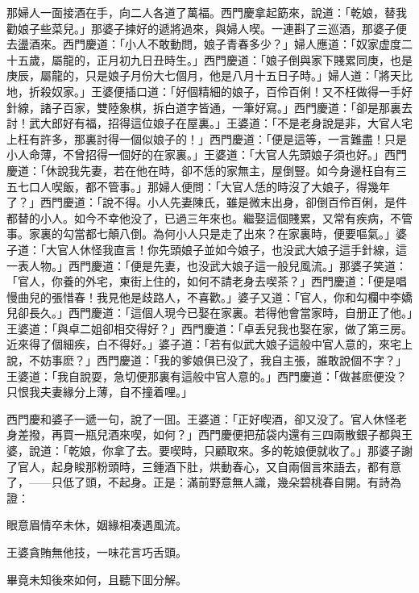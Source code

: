 那婦人一面接酒在手，向二人各道了萬福。西門慶拿起筯來，說道：「乾娘，替我勸娘子些菜兒。」那婆子揀好的遞將過來，與婦人喫。一連斟了三巡酒，那婆子便去盪酒來。西門慶道：「小人不敢動問，娘子青春多少？」婦人應道：「奴家虚度二十五歲，屬龍的，正月初九日丑時生。」西門慶道：「娘子倒與家下賤累同庚，也是庚辰，屬龍的，只是娘子月份大七個月，他是八月十五日子時。」婦人道：「將天比地，折殺奴家。」王婆便插口道：「好個精細的娘子，百伶百俐！又不枉做得一手好針線，諸子百家，雙陸象棋，拆白道字皆通，一筆好寫。」西門慶道：「卻是那裏去討！武大郎好有福，招得這位娘子在屋裏。」王婆道：「不是老身說是非，大官人宅上枉有許多，那裏討得一個似娘子的！」西門慶道：「便是這等，一言難盡！只是小人命薄，不曾招得一個好的在家裏。」王婆道：「大官人先頭娘子須也好。」西門慶道：「休說我先妻，若在他在時，卻不恁的家無主，屋倒豎。如今身邊枉自有三五七口人喫飯，都不管事。」那婦人便問：「大官人恁的時沒了大娘子，得幾年了？」西門慶道：「說不得。小人先妻陳氏，雖是微末出身，卻倒百伶百俐，是件都替的小人。如今不幸他没了，已過三年來也。繼娶這個賤累，又常有疾病，不管事。家裏的勾當都七顛八倒。為何小人只是走了出來？在家裏時，便要嘔氣。」婆子道：「大官人休怪我直言！你先頭娘子並如今娘子，也没武大娘子這手針線，這一表人物。」西門慶道：「便是先妻，也没武大娘子這一般兒風流。」那婆子笑道：「官人，你養的外宅，東街上住的，如何不請老身去喫茶？」西門慶道：「便是唱慢曲兒的張惜春！我見他是歧路人，不喜歡。」婆子又道：「官人，你和勾欄中李嬌兒卻長久。」西門慶道：「這個人現今已娶在家裏。若得他會當家時，自册正了他。」王婆道：「與卓二姐卻相交得好？」西門慶道：「卓丢兒我也娶在家，做了第三房。近來得了個細疾，白不得好。」婆子道：「若有似武大娘子這般中官人意的，來宅上說，不妨事麽？」西門慶道：「我的爹娘俱已没了，我自主張，誰敢說個不字？」王婆道：「我自說耍，急切便那裏有這般中官人意的。」西門慶道：「做甚麽便没？只恨我夫妻緣分上薄，自不撞着哩。」

西門慶和婆子一遞一句，說了一囬。王婆道：「正好喫酒，卻又没了。官人休怪老身差撥，再買一瓶兒酒來喫，如何？」西門慶便把茄袋内還有三四兩散銀子都與王婆，說道：「乾娘，你拿了去。要喫時，只顧取來。多的乾娘便就收了。」那婆子謝了官人，起身睃那粉頭時，三鍾酒下肚，烘動春心，又自兩個言來語去，都有意了，——只低了頭，不起身。正是：滿前野意無人識，幾朵碧桃春自開。有詩為證：

\begin{myquote}
眼意眉情卒未休，姻緣相凑遇風流。

王婆貪賄無他技，一味花言巧舌頭。
\end{myquote}

畢竟未知後來如何，且聽下囬分解。


